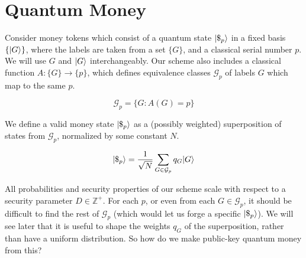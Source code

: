 \section{Quantum Money}
\label{sec:model}

Consider money tokens which consist of a quantum state $|\$_p \rangle$ in
a fixed basis $\{|G \rangle\}$, where the labels are taken from a set
$\{G\}$,
and a classical serial number $p$.
We will use $G$ and $|G \rangle$ interchangeably.
Our scheme also includes a classical function
$A: \{G\} \rightarrow \{p\}$, which defines equivalence
classes $\mathcal{G}_p$ of labels $G$ which map to the same $p$.

\begin{displaymath}
\mathcal{G}_p = \{G: A(G) = p \}
\end{displaymath}

We define a valid money state $|\$_p \rangle$ as a (possibly weighted)
superposition of states from $\mathcal{G}_p$, normalized by some constant
$N$.

\begin{displaymath}
|\$_p \rangle = \frac{1}{\sqrt{N}} \sum_{G \in \mathcal{G}_p} q_G |G \rangle
\end{displaymath}

All probabilities and security properties of our scheme scale
with respect to a security parameter $D \in \mathbb{Z}^+$.
For each $p$, or even from each
$G \in \mathcal{G}_p$, it should be difficult to find the rest of
$\mathcal{G}_p$ (which would let us forge
a specific $|\$_p \rangle$). We will see later that it is useful to
shape the weights $q_G$ of the superposition, rather than have a uniform
distribution. So how do we make public-key quantum money from this?
